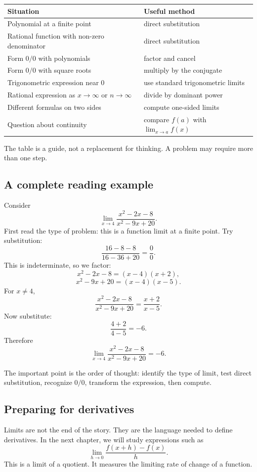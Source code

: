 \begin{center}
\begin{tabular}{ll}
\toprule
Situation & Useful method \\
\midrule
Polynomial at a finite point & direct substitution \\
Rational function with non-zero denominator & direct substitution \\
Form \(0/0\) with polynomials & factor and cancel \\
Form \(0/0\) with square roots & multiply by the conjugate \\
Trigonometric expression near \(0\) & use standard trigonometric limits \\
Rational expression as \(x\to\infty\) or \(n\to\infty\) & divide by dominant power \\
Different formulas on two sides & compute one-sided limits \\
Question about continuity & compare \(f(a)\) with \(\lim_{x\to a}f(x)\) \\
\bottomrule
\end{tabular}
\end{center}

The table is a guide, not a replacement for thinking. A problem may require more than one step.

\subsection*{A complete reading example}

Consider
\[
\lim_{x\to4}\frac{x^2-2x-8}{x^2-9x+20}.
\]
First read the type of problem: this is a function limit at a finite point. Try substitution:
\[
\frac{16-8-8}{16-36+20}=\frac00.
\]
This is indeterminate, so we factor:
\[
x^2-2x-8=(x-4)(x+2),
\]
\[
x^2-9x+20=(x-4)(x-5).
\]
For \(x\ne4\),
\[
\frac{x^2-2x-8}{x^2-9x+20}=\frac{x+2}{x-5}.
\]
Now substitute:
\[
\frac{4+2}{4-5}=-6.
\]
Therefore
\[
\lim_{x\to4}\frac{x^2-2x-8}{x^2-9x+20}=-6.
\]

The important point is the order of thought: identify the type of limit, test direct substitution, recognize \(0/0\), transform the expression, then compute.

\subsection*{Preparing for derivatives}

Limits are not the end of the story. They are the language needed to define derivatives. In the next chapter, we will study expressions such as
\[
\lim_{h\to0}\frac{f(x+h)-f(x)}{h}.
\]
This is a limit of a quotient. It measures the limiting rate of change of a function.

